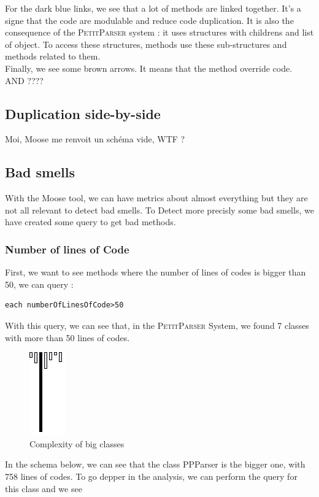 For the dark blue links, we see that a lot of methods are linked together.  It's a signe that the code are modulable and reduce code duplication.  It is also the consequence of the \textsc{PetitParser} system : it uses structures with childrens and list of object.  To access these structures,  methods use these sub-structures and methods related to them.\\

Finally, we see some brown arrows.  It means that the method override code.  AND ???? \\

\subsection{Duplication side-by-side}
Moi, Moose me renvoit un schéma vide, WTF ?

\subsection{Bad smells}
With the Moose tool, we can have metrics about almost everything but they are not all relevant to detect bad smells.  To Detect more precisly some bad smells, we have created some query to get bad methods.\\

\subsubsection{Number of lines of Code}
First, we want to see methods where the number of lines of codes is bigger than 50, we can query :
\begin{lstlisting}
each numberOfLinesOfCode>50
\end{lstlisting}
With this query, we can see that, in the \textsc{PetitParser} System, we found 7 classes with more than 50 lines of codes.\\

\begin{figure}[ht]
\centering
\label{system_complexity_big_classes}
\includegraphics[scale=0.55]{system_complexity_big_methods.png}
\caption{Complexity of big classes}
\end{figure}
In the schema below, we can see that the class PPParser is the bigger one, with 758 lines of codes.  To go depper in the analysis, we can perform the query for this class and we see \\
